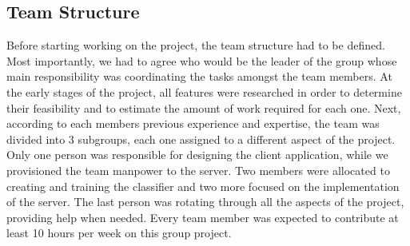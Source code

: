 \subsection{Team Structure} 
Before starting working on the project, the team structure had to be defined. Most importantly, we had to 
agree who would be the leader of the group whose main responsibility was coordinating the tasks amongst the 
team members. At the early stages of the project, all features were researched in order to 
determine their feasibility and to estimate the amount of work required for each one. Next, according to 
each members previous experience and expertise, the team was divided into 3 subgroups, each one assigned to 
a different aspect of the project. Only one person was responsible for designing the client application, while
we provisioned the team manpower to the server. Two members were allocated to creating and training 
the classifier and two more focused on the implementation of the server. The last person was rotating through 
all the aspects of the project, providing help when needed. Every team member was expected to contribute 
at least 10 hours per week on this group project.\\ 

